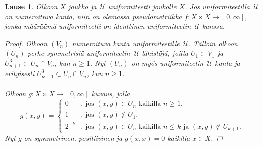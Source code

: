 \documentclass[12pt,a4paper,leqno]{report}
\newcommand{\U}{\,\mathcal{U}}
\theoremstyle{plain}
\newtheorem{lause}[equation]{Lause}
\theoremstyle{definition}
\theoremstyle{remark}
\begin{document}
\begin{lause}
Olkoon $X$ joukko ja $\U$ uniformiteetti joukolle $X$. 
Jos uniformiteetilla $\U$ on numeroituva kanta, 
niin on olemassa pseudometriikka $f\colon X\times X\rightarrow [0,\infty]$, 
jonka määräämä uniformiteetti on identtinen uniformiteetin $\U$ kanssa.
\begin{proof}
Olkoon $(V_n)$ numeroituva kanta uniformiteetille $\U$. 
Tällöin olkoon $(U_n)$ perhe symmetrisiä uniformiteetin $\U$ lähistöjä, 
joilla $U_1\subset V_1$ ja $U_{n+1}^3\subset U_n\cap V_n$, kun $n\geq 1$. 
Nyt $(U_n)$ on myös uniformiteetin $\U$ kanta ja erityisesti 
$U_{n+1}^3\subset U_n\cap V_n$, kun $n\geq 1$. \\
\\
Olkoon $g\colon X\times X\rightarrow [0,\infty]$ kuvaus, jolla 
\begin{equation*}
g(x,y)=
\begin{cases}
0&\text{, jos }(x,y)\in U_n\text{ kaikilla }n\geq 1, \\
1&\text{, jos }(x,y)\not\in U_1, \\
2^{-k}&\text{, jos }(x,y)\in U_n\text{ kaikilla }n\leq k 
\text{ ja } (x,y)\not\in U_{k+1}.
\end{cases}
\end{equation*}
Nyt $g$ on symmetrinen, positiivinen ja $g(x,x)=0$ kaikilla $x\in X$. 


\end{proof}
\end{lause}
\end{document}
